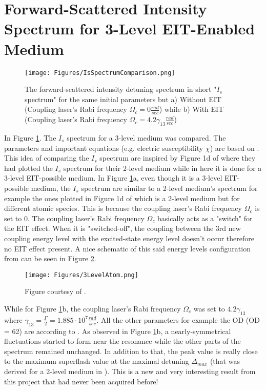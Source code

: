 \section{Forward-Scattered Intensity Spectrum for 3-Level EIT-Enabled Medium}

\begin{figure}[h!]
    \centering
    \texttt{[image: Figures/IsSpectrumComparison.png]}
    \caption{The forward-scattered intensity detuning spectrum in short "$I_{s}$ spectrum" for the same initial parameters but a) Without EIT (Coupling laser's Rabi frequency $\Omega_{c} = 0 \frac{rad}{sec}$) while b) With EIT (Coupling laser's Rabi frequency $\Omega_{c} = 4.2\gamma_{13} \frac{rad}{sec}$)}
    \label{fig: comparing Is spectrum}
\end{figure}

In Figure \ref{fig: comparing Is spectrum}. The $I_{s}$ spectrum for a 3-level medium was compared. The parameters and important equations (e.g. electric susceptibility $\chi$) are based on \cite{jeong2010slow}. This idea of comparing the $I_{s}$ spectrum are inspired by Figure 1d of \cite{Kwong2014} where they had plotted the $I_{s}$ spectrum for their 2-level medium while in here it is done for a 3-level EIT-possible medium. In Figure \ref{fig: comparing Is spectrum}a, even though it is a 3-level EIT-possible medium, the $I_{s}$ spectrum are similar to a 2-level medium's spectrum for example the ones plotted in Figure 1d of \cite{Kwong2014} which is a 2-level medium but for different atomic species. This is because the coupling laser's Rabi frequency $\Omega_{c}$ is set to $0$. The coupling laser's Rabi frequency $\Omega_{c}$ basically acts as a "switch" for the EIT effect. When it is "switched-off", the coupling between the 3rd new coupling energy level with the excited-state energy level doesn't occur therefore no EIT effect present. A nice schematic of this said energy levels configuration from \cite{Jeong2009} can be seen in Figure \ref{fig: 3LevelAtom}.

\begin{figure}[h!]
    \centering
    \texttt{[image: Figures/3LevelAtom.png]}
    \caption{Figure courtesy of \cite{Jeong2009}.}
    \label{fig: 3LevelAtom}
\end{figure}

While for Figure \ref{fig: comparing Is spectrum}b, the coupling laser's Rabi frequency $\Omega_{c}$ was set to $4.2\gamma_{13}$ where $\gamma_{13} = \frac{\Gamma}{2} = 1.885 \cdot 10^{7} \frac{rad}{sec}$. All the other parameters for example the OD (OD = 62) are according to \cite{jeong2010slow}. As observed in Figure \ref{fig: comparing Is spectrum}b, a nearly-symmetrical fluctuations started to form near the resonance while the other parts of the spectrum remained unchanged. In addition to that, the peak value is really close to the maximum superflash value at the maximal detuning $\Delta_{max}$ (that was derived for a 2-level medium in \cite{Kwong2017}). This is a new and very interesting result from this project that had never been acquired before!\\


